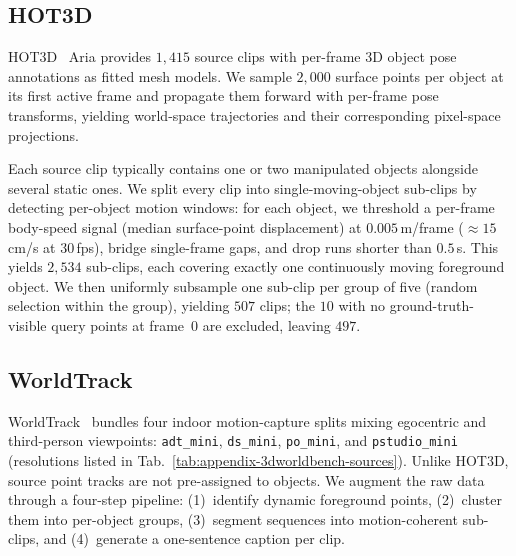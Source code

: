 \subsection{HOT3D}
\label{subsec:appendix_hot3d}

HOT3D~\cite{hot3d} Aria provides $1{,}415$ source clips with per-frame 3D object pose
annotations as fitted mesh models. We sample $2{,}000$ surface points per
object at its first active frame and propagate them forward with per-frame
pose transforms, yielding world-space trajectories and their corresponding
pixel-space projections.

Each source clip typically contains one or two manipulated objects alongside
several static ones. We split every clip into single-moving-object sub-clips by detecting
per-object motion windows: for each object, we threshold a per-frame
body-speed signal (median surface-point displacement) at $0.005$\,m/frame
(${\approx}15$\,cm/s at $30$\,fps), bridge single-frame gaps, and drop runs
shorter than $0.5$\,s. This yields $2{,}534$ sub-clips, each
covering exactly one continuously moving foreground object. We then uniformly
subsample one sub-clip per group of five (random selection within the group),
yielding $507$ clips; the $10$ with no ground-truth-visible query points at frame~$0$
are excluded, leaving $497$.


\subsection{WorldTrack}
\label{subsec:appendix_worldtrack_pipeline}

WorldTrack~\cite{feng2025st4rtrack} bundles four indoor motion-capture splits
mixing egocentric and third-person viewpoints: \texttt{adt\_mini},
\texttt{ds\_mini}, \texttt{po\_mini}, and \texttt{pstudio\_mini} (resolutions
listed in Tab.~\ref{tab:appendix-3dworldbench-sources}). Unlike HOT3D,
source point tracks are not pre-assigned to objects. We augment the raw data
through a four-step pipeline: (1)~identify dynamic foreground points,
(2)~cluster them into per-object groups, (3)~segment sequences into
motion-coherent sub-clips, and (4)~generate a one-sentence caption per clip.

